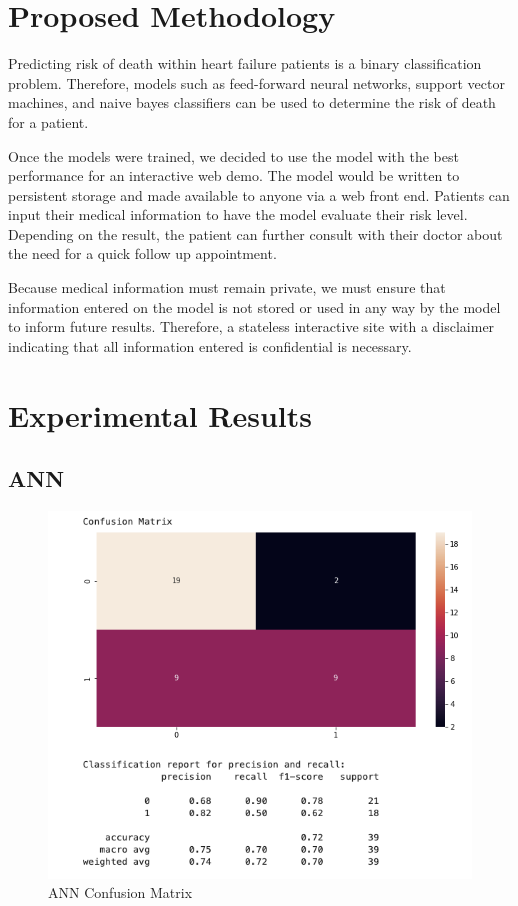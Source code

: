 \documentclass[11pt]{article}
\begin{document}
{}

{}

\section{Proposed Methodology}

{Predicting risk of death within heart failure patients is a binary
classification problem. Therefore, models such as feed-forward neural
networks, support vector machines, and naive bayes classifiers can be
used to determine the risk of death for a patient.}

{}

{Once the models were trained, we decided to use the model with the best
performance for an interactive web demo. The model would be written to
persistent storage and made available to anyone via a web front end.
Patients can input their medical information to have the model evaluate
their risk level. Depending on the result, the patient can further
consult with their doctor about the need for a quick follow up
appointment.}

{}

{Because medical information must remain private, we must ensure that
information entered on the model is not stored or used in any way by the
model to inform future results. Therefore, a stateless interactive site
with a disclaimer indicating that all information entered is
confidential is necessary.}

{}

\section{Experimental Results}

\subsection{ANN}

\begin{figure}[H]
	\centering
	\includegraphics[width=7.5in]{figures/ann_confusion.png}
	\caption{ANN Confusion Matrix}\label{fig:figures/ann_confusion.png}
\end{figure}
\end{document}
